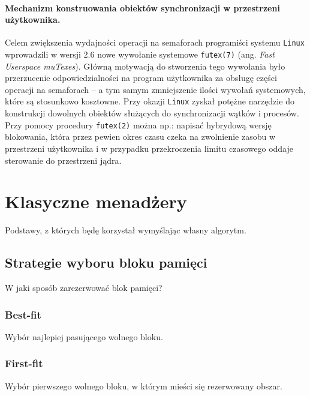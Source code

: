 \documentclass[12pt,a4paper,titlepage,twoside]{mwart}
\begin{document}
\paragraph{Mechanizm konstruowania obiektów synchronizacji w przestrzeni
użytkownika.} Celem zwiększenia wydajności operacji na semaforach programiści
systemu \texttt{Linux} wprowadzili w wersji 2.6 nowe wywołanie systemowe
\verb+futex(7)+ (ang. \textit{Fast Userspace muTexes}). Główną motywacją do
stworzenia tego wywołania było przerzucenie odpowiedzialności na program
użytkownika za obsługę części operacji na semaforach -- a tym samym
zmniejszenie ilości wywołań systemowych, które są stosunkowo kosztowne. Przy
okazji \texttt{Linux} zyskał potężne narzędzie do konstrukcji dowolnych
obiektów służących do synchronizacji wątków i procesów. Przy pomocy procedury
\verb+futex(2)+ można np.: napisać hybrydową wersję blokowania, która przez
pewien okres czasu czeka na zwolnienie zasobu w przestrzeni użytkownika i w
przypadku przekroczenia limitu czasowego oddaje sterowanie do przestrzeni
jądra.

\newpage


\section{Klasyczne menadżery}
\hypertarget{Klasyka}{}

Podstawy, z których będę korzystał wymyślając własny algorytm.

\subsection{Strategie wyboru bloku pamięci}

W jaki sposób zarezerwować blok pamięci?

\subsubsection{Best-fit}

Wybór najlepiej pasującego wolnego bloku.

\subsubsection{First-fit}

Wybór pierwszego wolnego bloku, w którym mieści się rezerwowany obszar.
\end{document}
